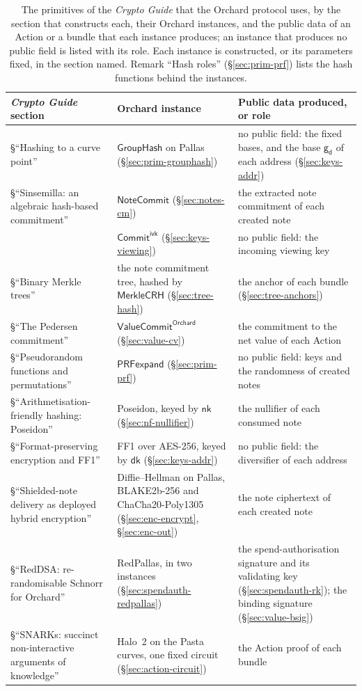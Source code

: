 \documentclass[11pt,a4paper]{article}
\theoremstyle{definition}
\newcommand{\NoteCommit}{\ensuremath{\mathsf{NoteCommit}}}
\newcommand{\CommitIvk}{\ensuremath{\mathsf{Commit}^{\mathsf{ivk}}}}
\newcommand{\GroupHash}{\ensuremath{\mathsf{GroupHash}}}
\newcommand{\nksym}{\ensuremath{\mathsf{nk}}}
\newcommand{\dk}{\ensuremath{\mathsf{dk}}}
\newcommand{\gd}{\ensuremath{\mathsf{g_d}}}
\begin{document}
\begin{table}[tp]
\centering\small
\setlength{\tabcolsep}{4pt}
\begin{tabular}{@{}p{4.5cm}p{4.0cm}p{4.7cm}@{}}
\toprule
\emph{Crypto Guide} section & Orchard instance & Public data produced,
  or role \tabularnewline
\midrule
\S``Hashing to a curve point''
  & $\GroupHash$ on Pallas (\S\ref{sec:prim-grouphash})
  & no public field: the fixed bases, and the base $\gd$ of each address
    (\S\ref{sec:keys-addr}) \tabularnewline
\S``Sinsemilla: an algebraic hash-based commitment''
  & $\NoteCommit$ (\S\ref{sec:notes-cm})
  & the extracted note commitment of each created note \tabularnewline
  & $\CommitIvk$ (\S\ref{sec:keys-viewing})
  & no public field: the incoming viewing key \tabularnewline
\S``Binary Merkle trees''
  & the note commitment tree, hashed by $\mathsf{MerkleCRH}$
    (\S\ref{sec:tree-hash})
  & the anchor of each bundle (\S\ref{sec:tree-anchors}) \tabularnewline
\S``The Pedersen commitment''
  & $\mathsf{ValueCommit}^{\mathsf{Orchard}}$ (\S\ref{sec:value-cv})
  & the commitment to the net value of each Action \tabularnewline
\S``Pseudorandom functions and permutations''
  & $\mathsf{PRFexpand}$ (\S\ref{sec:prim-prf})
  & no public field: keys and the randomness of created notes
    \tabularnewline
\S``Arithmetisation-friendly hashing: Poseidon''
  & Poseidon, keyed by $\nksym$ (\S\ref{sec:nf-nullifier})
  & the nullifier of each consumed note \tabularnewline
\S``Format-preserving encryption and FF1''
  & FF1 over AES-256, keyed by $\dk$ (\S\ref{sec:keys-addr})
  & no public field: the diversifier of each address \tabularnewline
\S``Shielded-note delivery as deployed hybrid encryption''
  & Diffie--Hellman on Pallas, BLAKE2b-256 and ChaCha20-Poly1305
    (\S\ref{sec:enc-encrypt}, \S\ref{sec:enc-out})
  & the note ciphertext of each created note \tabularnewline
\S``RedDSA: re-randomisable Schnorr for Orchard''
  & RedPallas, in two instances (\S\ref{sec:spendauth-redpallas})
  & the spend-authorisation signature and its validating key
    (\S\ref{sec:spendauth-rk}); the binding signature
    (\S\ref{sec:value-bsig}) \tabularnewline
\S``SNARKs: succinct non-interactive arguments of knowledge''
  & Halo~2 on the Pasta curves, one fixed circuit
    (\S\ref{sec:action-circuit})
  & the Action proof of each bundle \tabularnewline
\bottomrule
\end{tabular}
\caption{The primitives of the \emph{Crypto Guide} that the Orchard protocol
uses, by the section that constructs each, their Orchard instances, and the
public data of an Action or a bundle that each instance produces; an
instance that produces no public field is listed with its role. Each
instance is constructed, or its parameters fixed, in the section named.
Remark ``Hash roles'' (\S\ref{sec:prim-prf}) lists the hash functions behind
the instances.}
\label{tab:prim-map}
\end{table}
\end{document}
